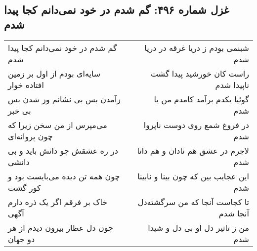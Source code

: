 \begin{center}
\section*{غزل شماره ۴۹۶: گم شدم در خود نمی‌دانم کجا پیدا شدم}
\label{sec:496}
\begin{longtable}{l p{0.5cm} r}
گم شدم در خود نمی‌دانم کجا پیدا شدم
&&
شبنمی بودم ز دریا غرقه در دریا شدم
\\
سایه‌ای بودم از اول بر زمین افتاده خوار
&&
راست کان خورشید پیدا گشت ناپیدا شدم
\\
زآمدن بس بی نشانم وز شدن بس بی خبر
&&
گوئیا یکدم برآمد کامدم من یا شدم
\\
می‌مپرس از من سخن زیرا که چون پروانه‌ای
&&
در فروغ شمع روی دوست ناپروا شدم
\\
در ره عشقش چو دانش باید و بی دانشی
&&
لاجرم در عشق هم نادان و هم دانا شدم
\\
چون همه تن دیده می‌بایست بود و کور گشت
&&
این عجایب بین که چون بینا و نابینا شدم
\\
خاک بر فرقم اگر یک ذره دارم آگهی
&&
تا کجاست آنجا که من سرگشته‌دل آنجا شدم
\\
چون دل عطار بیرون دیدم از هر دو جهان
&&
من ز تاثیر دل او بی دل و شیدا شدم
\\
\end{longtable}
\end{center}
